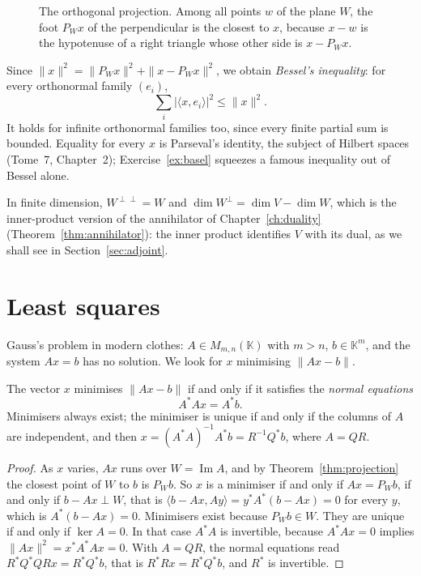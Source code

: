 \begin{figure}[ht]
\centering
{}
\caption{The orthogonal projection. Among all points $w$ of the plane $W$, the foot $P_Wx$ of the perpendicular is the
closest to $x$, because $x-w$ is the hypotenuse of a right triangle whose other side is $x-P_Wx$.}
\label{fig:projection}
\end{figure}

Since $\|x\|^2=\|P_Wx\|^2+\|x-P_Wx\|^2$, we obtain \emph{Bessel's inequality}: for every orthonormal family $(e_i)$,
\begin{equation}\label{eq:bessel}
\sum_i|\langle x,e_i\rangle|^2\le\|x\|^2.
\end{equation}
It holds for infinite orthonormal families too, since every finite partial sum is bounded. Equality for every $x$ is
Parseval's identity, the subject of Hilbert spaces (Tome~7, Chapter~2); Exercise~\ref{ex:basel} squeezes a famous
inequality out of Bessel alone.

In finite dimension, $W^{\perp\perp}=W$ and $\dim W^\perp=\dim V-\dim W$, which is the inner-product version of the
annihilator of Chapter~\ref{ch:duality} (Theorem~\ref{thm:annihilator}): the inner product identifies $V$ with its dual,
as we shall see in Section~\ref{sec:adjoint}.

\section{Least squares}

Gauss's problem in modern clothes: $A\in M_{m,n}(\mathbb K)$ with $m>n$, $b\in\mathbb K^m$, and the system $Ax=b$ has no
solution. We look for $x$ minimising $\|Ax-b\|$.

\begin{theorem}\label{thm:lsq}
The vector $x$ minimises $\|Ax-b\|$ if and only if it satisfies the \emph{normal equations}
\[
A^*Ax=A^*b.
\]
Minimisers always exist; the minimiser is unique if and only if the columns of $A$ are independent, and then
$x=(A^*A)^{-1}A^*b=R^{-1}Q^*b$, where $A=QR$.
\end{theorem}
\begin{proof}
As $x$ varies, $Ax$ runs over $W=\operatorname{Im}A$, and by Theorem~\ref{thm:projection} the closest point of $W$ to
$b$ is $P_Wb$. So $x$ is a minimiser if and only if $Ax=P_Wb$, if and only if $b-Ax\perp W$, that is
$\langle b-Ax,Ay\rangle=y^*A^*(b-Ax)=0$ for every $y$, which is $A^*(b-Ax)=0$. Minimisers exist because $P_Wb\in W$.
They are unique if and only if $\ker A=0$. In that case $A^*A$ is invertible, because $A^*Ax=0$ implies
$\|Ax\|^2=x^*A^*Ax=0$. With $A=QR$, the normal equations read $R^*Q^*QRx=R^*Q^*b$, that is $R^*Rx=R^*Q^*b$, and $R^*$ is
invertible.
\end{proof}

